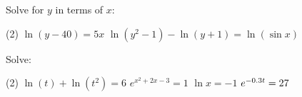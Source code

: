 \documentclass[answers]{exam}
\begin{document}
  \begin{ex*}
    Solve for $y$ in terms of $x$:
    \begin{extasks}(2)
      \task $\ln(y-40)=5x$
      \task $\ln(y^2-1)-\ln(y+1)=\ln(\sin x)$
    \end{extasks}
  \end{ex*}
  \vfill
  \begin{ex*}
    Solve:
    \begin{tasks}[after-item-skip=\stretch{1}](2)
      \task[] $\ln(t)+\ln(t^2)=6$
      \task[] $e^{x^2+2x-3}=1$
      \task[] $\ln x=-1$
      \task[] $e\inv[0.3t]=27$
    \end{tasks}
  \end{ex*}
  \pagebreak
\end{document}
